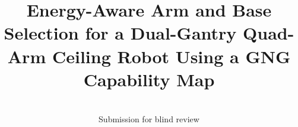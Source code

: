 \documentclass[conference]{IEEEtran}
\begin{document}
\title{Energy-Aware Arm and Base Selection for a Dual-Gantry Quad-Arm Ceiling Robot Using a GNG Capability Map\\}

\author{\\Submission for blind review}

\maketitle
\end{document}
